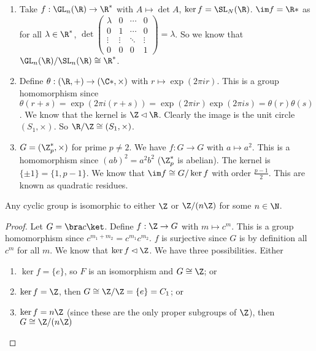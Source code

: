 \documentclass[a4paper]{article}
\begin{document}
  \begin{eg}\leavevmode
    \begin{enumerate}
      \item Take $f: \GL_n(\R) \to \R^*$ with $A \mapsto \det A$, $\ker f = \SL_N(\R)$. $\im f = \R*$ as for all $\lambda \in \R^*$, $\det 
        \begin{pmatrix}
          \lambda & 0 & \cdots & 0 \\
          0 &1 & \cdots & 0\\
          \vdots &\vdots &\ddots & \vdots\\
          0& 0 & 0 &1
        \end{pmatrix}
        = \lambda$. So we know that $\GL_n(\R)/\SL_n(\R) \cong \R^*$.
      \item Define $\theta: (\R, +) \to (\C*, \times)$ with $r\mapsto \exp(2\pi ir)$. This is a group homomorphism since $\theta(r + s) = \exp(2\pi i(r + s)) = \exp (2\pi i r)\exp (2\pi i s) = \theta(r)\theta(s)$. We know that the kernel is $\Z\lhd \R$. Clearly the image is the unit circle $(S_1, \times)$. So $\R/\Z \cong (S_1, \times)$.
      \item $G = (\Z_p^*, \times)$ for prime $p\not= 2$. We have $f: G\to G$ with $a\mapsto a^2$. This is a homomorphism since $(ab)^2 = a^2b^2$ ($\Z_p^*$ is abelian). The kernel is $\{\pm 1\} = \{1, p - 1\}$. We know that $\im f\cong G/\ker f$ with order $\frac{p - 1}{2}$. This are known as quadratic residues. 
    \end{enumerate}
  \end{eg}

  \begin{lemma}
    Any cyclic group is isomorphic to either $\Z$ or $\Z/(n\Z)$ for some $n\in \N$.
  \end{lemma}

  \begin{proof}
    Let $G = \bra c\ket$. Define $f: \Z \to G$ with $m\mapsto c^m$. This is a group homomorphism since $c^{m_1 + m_2} = c^{m_1}c^{m_2}$. $f$ is surjective since $G$ is by definition all $c^m$ for all $m$. We know that $\ker f\lhd \Z$. We have three possibilities. Either
    \begin{enumerate}
      \item $\ker f = \{e\}$, so $F$ is an isomorphism and $G\cong \Z$; or
      \item $\ker f = \Z$, then $G\cong \Z/\Z = \{e\} = C_1$; or
      \item $\ker f = n\Z$ (since these are the only proper subgroups of $\Z$), then $G\cong \Z/(n\Z)$
    \end{enumerate}
  \end{proof}
\end{document}
